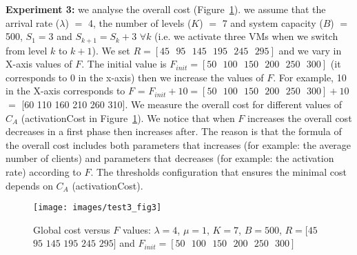 \documentclass[conference]{IEEEtran}
\begin{document}
\textbf{Experiment 3:} we analyse the overall cost (Figure~\ref{fig:image-chap4-1_par_1_test3_fig3}). we assume that the arrival rate ($\lambda$) $=$ 4, the number of levels ($K$) $=$ 7 and system capacity ($B$) $=$ 500, $S_{1}=3$ and
$S_{k+1}=S_{k}+3$ $\forall k$ (i.e. we activate three VMs when we switch from level $k$ to $k+1$). We set $R=[45\mbox{ }95\mbox{ }145\mbox{ }195\mbox{ }245\mbox{ }295]$ and we vary in X-axis values of $F$. The initial value is $F_{init}=[50\mbox{ }100\mbox{ }150\mbox{ }200\mbox{ }250\mbox{ }300]$ (it corresponds to 0 in the x-axis) then we increase the values of $F$. For example, 10 in the X-axis corresponds to $F$ = $F_{init}+10=[50\mbox{ }100\mbox{ }150\mbox{ }200\mbox{ }250\mbox{ }300]+10$ $=$ [60 110 160 210 260 310]. We measure the overall cost for different values of $C_{A}$ (activationCost in Figure~\ref{fig:image-chap4-1_par_1_test3_fig3}). We notice that when $F$ increases the overall cost decreases in a first phase then increases after. The reason is that the formula of the overall cost includes both parameters that increases (for example: the average number of clients) and parameters that decreases (for example: the activation rate) according to $F$. The thresholds configuration that ensures the minimal cost depends on $C_{A}$ (activationCost).

\begin{figure}[!ht]
\centering
\texttt{[image: images/test3\_fig3]}
\caption{Global cost versus $F$ values: $\lambda=4$,  $\mu=1$, $K=7$, $B=500$, $R=[45$ $95$ $145$ $195$ $245$ $295]$ and $F_{init}=[50\mbox{ }100\mbox{ }150\mbox{ }200\mbox{ }250\mbox{ }300]$}
\label{fig:image-chap4-1_par_1_test3_fig3}
\end{figure}
\end{document}
